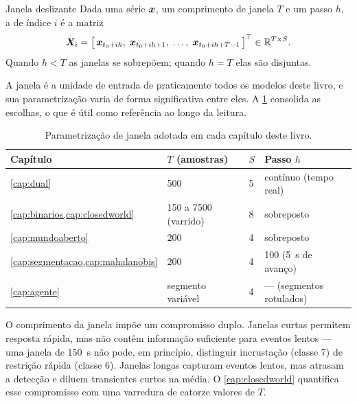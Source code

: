 \begin{definicao}{Janela deslizante}
Dada uma série $\bm{x}$, um comprimento de janela $T$ e um passo $h$, a
 de índice $i$ é a matriz
\[
  \bm{X}_i = \big[\, \bm{x}_{t_0 + ih},\; \bm{x}_{t_0 + ih + 1},\;
  \dots,\; \bm{x}_{t_0 + ih + T - 1} \,\big]^{\top} \in \mathbb{R}^{T \times S}.
\]
Quando $h < T$ as janelas se sobrepõem; quando $h = T$ elas são disjuntas.
\end{definicao}

A janela é a unidade de entrada de praticamente todos os modelos deste livro, e sua
parametrização varia de forma significativa entre eles. A \cref{tab:dados-janelas}
consolida as escolhas, o que é útil como referência ao longo da leitura.

\begin{table}[htbp]
\centering
\caption{Parametrização de janela adotada em cada capítulo deste livro.}
\label{tab:dados-janelas}
\small
\begin{tabular}{llll}
\toprule
\textbf{Capítulo} & \textbf{$T$ (amostras)} & \textbf{$S$} & \textbf{Passo $h$} \\
\midrule
\cref{cap:dual}         & 500                & 5 & contínuo (tempo real) \\
\cref{cap:binarios,cap:closedworld} & 150 a 7500 (varrido) & 8 & sobreposto \\
\cref{cap:mundoaberto}  & 200                & 4 & sobreposto \\
\cref{cap:segmentacao,cap:mahalanobis} & 200 & 4 & 100 (\SI{5}{\second} de avanço) \\
\cref{cap:agente}       & segmento variável  & 4 & --- (segmentos rotulados) \\
\bottomrule
\end{tabular}
\end{table}

\begin{destaque}
O comprimento da janela impõe um compromisso duplo. Janelas curtas permitem resposta
rápida, mas não contêm informação suficiente para eventos lentos --- uma janela de
\SI{150}{\second} não pode, em princípio, distinguir incrustação (classe 7) de
restrição rápida (classe 6). Janelas longas capturam eventos lentos, mas atrasam a
detecção e diluem transientes curtos na média. O \cref{cap:closedworld} quantifica
esse compromisso com uma varredura de catorze valores de $T$.
\end{destaque}

